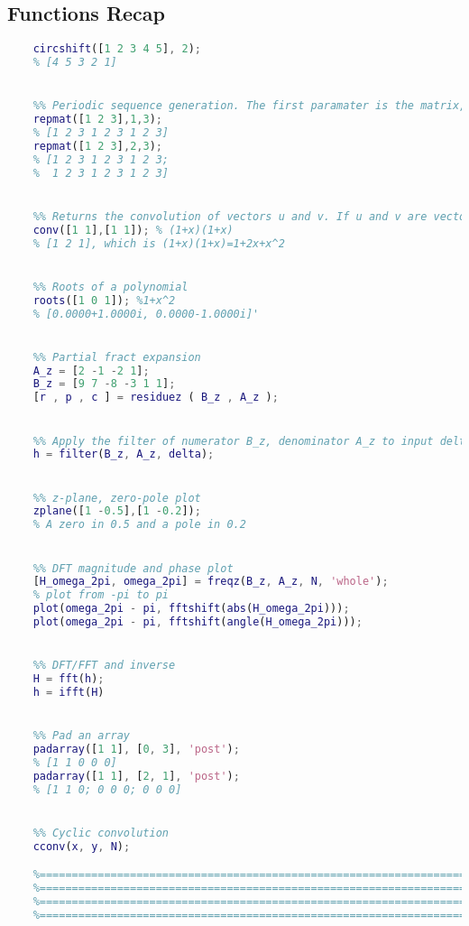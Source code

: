 \pagebreak\subsection{Functions Recap}
\begin{lstlisting}[language=Matlab, escapeinside=`']
    %% Shifting discrete signals, a positive value will shift to the right. Circular, if shifting right by n, first n values will become the last n values
    circshift([1 2 3 4 5], 2);
    % [4 5 3 2 1]


    %% Periodic sequence generation. The first paramater is the matrix, the second one is the rows repetition, the third is the cols repetition
    repmat([1 2 3],1,3);
    % [1 2 3 1 2 3 1 2 3]
    repmat([1 2 3],2,3);
    % [1 2 3 1 2 3 1 2 3;
    %  1 2 3 1 2 3 1 2 3] 


    %% Returns the convolution of vectors u and v. If u and v are vectors of polynomial coefficients, convolving them is equivalent to multiplying the two polynomials.
    conv([1 1],[1 1]); % (1+x)(1+x)
    % [1 2 1], which is (1+x)(1+x)=1+2x+x^2


    %% Roots of a polynomial
    roots([1 0 1]); %1+x^2
    % [0.0000+1.0000i, 0.0000-1.0000i]'


    %% Partial fract expansion
    A_z = [2 -1 -2 1];
    B_z = [9 7 -8 -3 1 1];
    [r , p , c ] = residuez ( B_z , A_z );


    %% Apply the filter of numerator B_z, denominator A_z to input delta
    h = filter(B_z, A_z, delta);


    %% z-plane, zero-pole plot
    zplane([1 -0.5],[1 -0.2]);
    % A zero in 0.5 and a pole in 0.2


    %% DFT magnitude and phase plot
    [H_omega_2pi, omega_2pi] = freqz(B_z, A_z, N, 'whole');
    % plot from -pi to pi
    plot(omega_2pi - pi, fftshift(abs(H_omega_2pi)));
    plot(omega_2pi - pi, fftshift(angle(H_omega_2pi)));


    %% DFT/FFT and inverse
    H = fft(h);
    h = ifft(H)


    %% Pad an array
    padarray([1 1], [0, 3], 'post');
    % [1 1 0 0 0]
    padarray([1 1], [2, 1], 'post');
    % [1 1 0; 0 0 0; 0 0 0]


    %% Cyclic convolution
    cconv(x, y, N);

    %==========================================================================
    %==========================================================================
    %==========================================================================
    %==========================================================================
\end{lstlisting}
